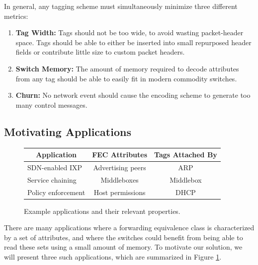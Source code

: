 In general, any tagging scheme must simultaneously minimize three different metrics:
\begin{enumerate}
\item \textbf{Tag Width:} Tags should not be too wide, to avoid wasting packet-header space.
Tags should be able to either be inserted into small repurposed header fields or contribute little size to custom packet headers. 
\item \textbf{Switch Memory:} The amount of memory required to decode attributes from any tag should be able to easily fit in modern commodity switches.
\item \textbf{Churn:} No network event should cause the encoding scheme to generate too many control messages.
\end{enumerate}


\subsection{Motivating Applications}
\begin{figure}
\small
\begin{center}
    \begin{tabular}{|l|c|c|}
    \hline
    \multicolumn{1}{|c|}{\bf Application} & 
    \multicolumn{1}{c|}{\bf FEC Attributes} & 
    \multicolumn{1}{c|}{\bf Tags Attached By}\\ \hline
    SDN-enabled IXP & Advertising peers & ARP \\ \hline
    Service chaining & Middleboxes & Middlebox \\ \hline
    Policy enforcement & Host permissions & DHCP \\ \hline
    \end{tabular}
\end{center}
    \caption{Example applications and their relevant properties. } 
    \label{tab:applications}
\end{figure}

There are many applications where a forwarding equivalence class is characterized by a set of attributes, and where the switches could benefit from being able to read these sets using a small amount of memory. To motivate our solution, we will present three such applications, which are summarized in Figure \ref{tab:applications}.
 
